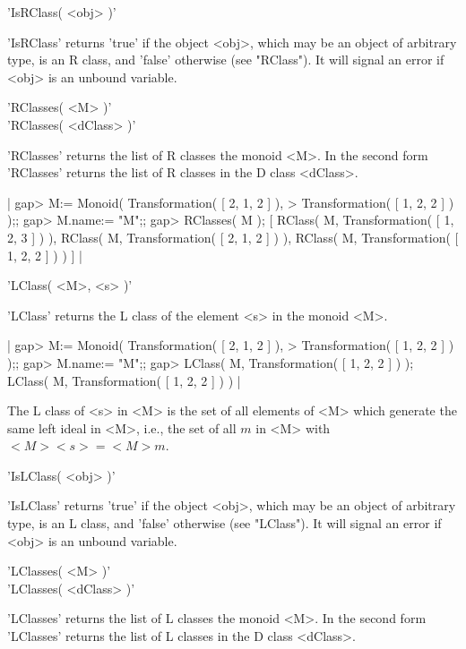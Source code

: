 'IsRClass( <obj> )'

'IsRClass' returns 'true' if the object <obj>, which  may be an object of
arbitrary type, is an R class, and 'false' otherwise  (see "RClass").  It
will signal an error if <obj> is an unbound variable.


'RClasses( <M> )'\\
'RClasses( <dClass> )'

'RClasses' returns the list  of R classes the monoid  <M>.  In the second
form 'RClasses' returns the list of R classes in the D class <dClass>.

|    gap> M:= Monoid( Transformation( [ 2, 1, 2 ] ),
    > Transformation( [ 1, 2, 2 ] ) );;
    gap> M.name:= "M";;
    gap> RClasses( M );
    [ RClass( M, Transformation( [ 1, 2, 3 ] ) ), 
      RClass( M, Transformation( [ 2, 1, 2 ] ) ), 
      RClass( M, Transformation( [ 1, 2, 2 ] ) ) ] |


'LClass( <M>, <s> )'

'LClass' returns the L class of the element <s> in the monoid <M>.

|    gap> M:= Monoid( Transformation( [ 2, 1, 2 ] ),
    > Transformation( [ 1, 2, 2 ] ) );;
    gap> M.name:= "M";;
    gap> LClass( M, Transformation( [ 1, 2, 2 ] ) );
    LClass( M, Transformation( [ 1, 2, 2 ] ) ) |

The  L class of  <s>  in <M> is  the  set of  all  elements of <M>  which
generate the same  left  ideal in <M>, i.e.,  the set of  all $m$  in <M>
with $<M> <s> = <M> m$.

%

'IsLClass( <obj> )'

'IsLClass' returns 'true' if the object <obj>, which  may be an object of
arbitrary type, is an L class, and  'false' otherwise (see "LClass").  It
will signal an error if <obj> is an unbound variable.


'LClasses( <M> )'\\
'LClasses( <dClass> )'

'LClasses' returns the list  of L classes  the monoid <M>.  In the second
form 'LClasses' returns the list of L classes in the D class <dClass>.

